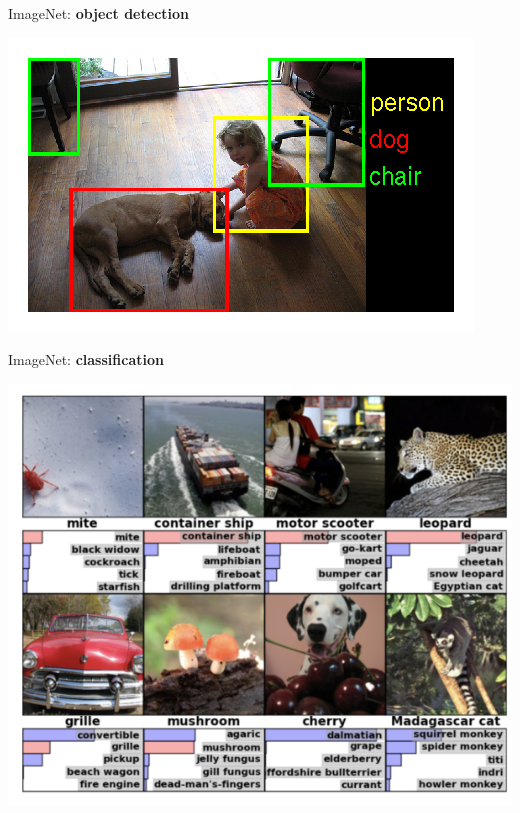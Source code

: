 \documentclass[12pt,t]{beamer}
\begin{document}
\begin{frame}

ImageNet: {\bf object detection}

\centerline{
\includegraphics[height=0.8\textheight]{./images/imagenet-objdet.png} 
}

\end{frame}

\begin{frame}

ImageNet: {\bf classification}

\centerline{
\includegraphics[height=0.8\textheight]{./images/imagenet.png} 
}

\end{frame}
\end{document}
